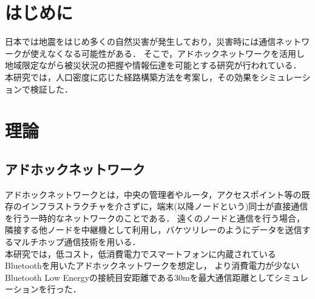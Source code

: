 \documentclass[a4paper, 9pt]{ltjsarticle}
\begin{document}
\setlength{\columnsep}{7.5mm}

\twocolumn[
    \begin{center}
        {\vspace{-1em}}

        {\fontsize{15pt}{15pt}\selectfont{災害時を想定したアドホックネットワーク構築手法の検討}}

        {\vspace{1.5em}}

        {\fontsize{13pt}{13pt}\selectfont{Study of Construction Methods for Ad-Hoc Network under Disaster}}
    \end{center}



    \begin{flushright}
      {\fontsize{11pt}{11pt}\selectfont{T5-17　末廣隼人\\}}
      {\fontsize{11pt}{11pt}\selectfont{指導教員　髙﨑和之}}
    \end{flushright}

    \vspace{1em}

    \thispagestyle{empty}
]

\section{はじめに} \label{label:first}
日本では地震をはじめ多くの自然災害が発生しており，災害時には通信ネットワークが使えなくなる可能性がある．
そこで，アドホックネットワークを活用し地域限定ながら被災状況の把握や情報伝達を可能とする研究が行われている．
本研究では，人口密度に応じた経路構築方法を考案し，その効果をシミュレーションで検証した．%

\section{理論} \label{label:theory}
\subsection{アドホックネットワーク} \label{sublabel:about ad-hoc network}
アドホックネットワークとは，中央の管理者やルータ，アクセスポイント等の既存のインフラストラクチャを介さずに，端末(以降ノードという)同士が直接通信を行う一時的なネットワークのことである．
遠くのノードと通信を行う場合，隣接する他ノードを中継機として利用し，バケツリレーのようにデータを送信するマルチホップ通信技術を用いる．%
\\ \indent 本研究では，低コスト，低消費電力でスマートフォンに内蔵されているBluetoothを用いたアドホックネットワークを想定し，
より消費電力が少ないBluetooth Low Energyの接続目安距離である30mを最大通信距離としてシミュレーションを行った．
\end{document}
